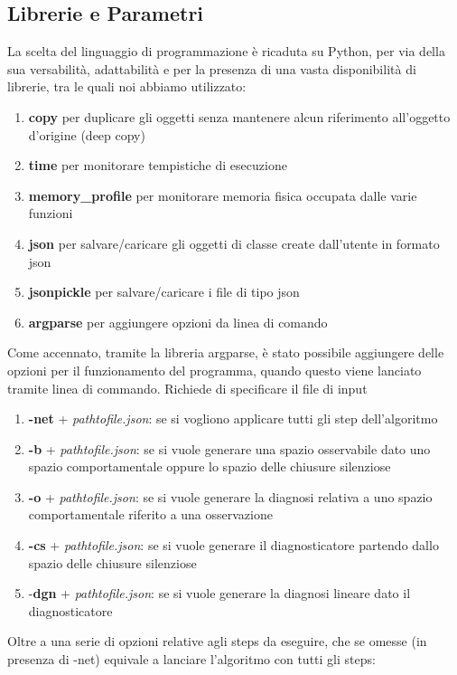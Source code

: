 \subsection{Librerie e Parametri}
La scelta del linguaggio di programmazione è ricaduta su Python, per via della sua versabilità, adattabilità e per la presenza di una vasta disponibilità di librerie, tra le quali noi abbiamo utilizzato:
\begin{enumerate}
    \item \textbf{copy} per duplicare gli oggetti senza mantenere alcun riferimento all’oggetto d'origine (deep copy)
    \item \textbf{time} per monitorare tempistiche di esecuzione
    \item \textbf{memory\_profile} per monitorare memoria fisica occupata dalle varie funzioni
    \item \textbf{json} per salvare/caricare gli oggetti di classe create dall’utente in formato json
    \item \textbf{jsonpickle} per salvare/caricare i file di tipo json
    \item \textbf{argparse} per aggiungere opzioni da linea di comando
\end{enumerate}
Come accennato, tramite la libreria argparse, è stato possibile aggiungere delle opzioni per il funzionamento del programma, quando questo viene lanciato tramite linea di commando.
Richiede di specificare il file di input
\begin{enumerate}
    \item \textbf{-net} + \textit{pathtofile.json}: se si vogliono applicare tutti gli step dell'algoritmo
    \item \textbf{-b} + \textit{pathtofile.json}: se si vuole generare una spazio osservabile dato uno spazio comportamentale oppure lo spazio delle chiusure silenziose
    \item \textbf{-o} + \textit{pathtofile.json}: se si vuole generare la diagnosi relativa a uno spazio comportamentale riferito a una osservazione
    \item \textbf{-cs} + \textit{pathtofile.json}: se si vuole generare il diagnosticatore partendo dallo spazio delle chiusure silenziose
    \item -\textbf{dgn} + \textit{pathtofile.json}: se si vuole generare la diagnosi lineare dato il diagnosticatore
\end{enumerate}
Oltre a una serie di opzioni relative agli steps da eseguire, che se omesse (in presenza di -net) equivale a lanciare l'algoritmo con tutti gli steps:
